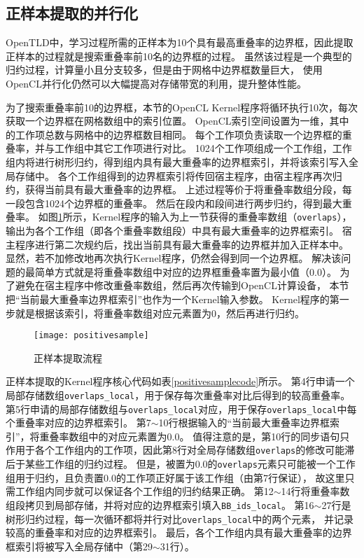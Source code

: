 \subsection{正样本提取的并行化}
OpenTLD中，学习过程所需的正样本为10个具有最高重叠率的边界框，因此提取正样本的过程就是搜索重叠率前10名的边界框的过程。
虽然该过程是一个典型的归约过程，计算量小且分支较多，但是由于网格中边界框数量巨大，
使用OpenCL并行化仍然可以大幅提高对存储带宽的利用，提升整体性能。

为了搜索重叠率前10的边界框，本节的OpenCL Kernel程序将循环执行10次，每次获取一个边界框在网格数组中的索引位置。
OpenCL索引空间设置为一维，其中的工作项总数与网格中的边界框数目相同。
每个工作项负责读取一个边界框的重叠率，并与工作组中其它工作项进行对比。
1024个工作项组成一个工作组，工作组内将进行树形归约，得到组内具有最大重叠率的边界框索引，并将该索引写入全局存储中。
各个工作组得到的边界框索引将传回宿主程序，由宿主程序再次归约，获得当前具有最大重叠率的边界框。
上述过程等价于将重叠率数组分段，每一段包含1024个边界框的重叠率。
然后在段内和段间进行两步归约，得到最大重叠率。
如图\ref{positivesample}所示，Kernel程序的输入为上一节获得的重叠率数组（\texttt{overlaps}），输出为各个工作组（即各个重叠率数组段）中具有最大重叠率的边界框索引。
宿主程序进行第二次规约后，找出当前具有最大重叠率的边界框并加入正样本中。
显然，若不加修改地再次执行Kernel程序，仍然会得到同一个边界框。
解决该问题的最简单方式就是将重叠率数组中对应的边界框重叠率置为最小值（$0.0$）。
为了避免在宿主程序中修改重叠率数组，然后再次传输到OpenCL计算设备，
本节把``当前最大重叠率边界框索引''也作为一个Kernel输入参数。
Kernel程序的第一步就是根据该索引，将重叠率数组对应元素置为0，然后再进行归约。

\begin{figure}[htb]
  \centering
  \texttt{[image: positivesample]}
  \caption{正样本提取流程}
  \label{positivesample}
\end{figure}

正样本提取的Kernel程序核心代码如表\ref{positivesamplecode}所示。
第4行申请一个局部存储数组\texttt{overlaps\_local}，用于保存每次重叠率对比后得到的较高重叠率。
第5行申请的局部存储数组与\texttt{overlaps\_local}对应，用于保存\texttt{overlaps\_local}中每个重叠率对应的边界框索引。
第7$\sim$10行根据输入的``当前最大重叠率边界框索引''，将重叠率数组中的对应元素置为$0.0$。
值得注意的是，第10行的同步语句只作用于各个工作组内的工作项，因此第8行对全局存储数组\texttt{overlaps}的修改可能滞后于某些工作组的归约过程。
但是，被置为$0.0$的\texttt{overlaps}元素只可能被一个工作组用于归约，且负责置$0.0$的工作项正好属于该工作组（由第7行保证），
故这里只需工作组内同步就可以保证各个工作组的归约结果正确。
第12$\sim$14行将重叠率数组段拷贝到局部存储，并将对应的边界框索引填入\texttt{BB\_ids\_local}。
第16$\sim$27行是树形归约过程，每一次循环都将并行对比\texttt{overlaps\_local}中的两个元素，
并记录较高的重叠率和对应的边界框索引。
最后，各个工作组内具有最大重叠率的边界框索引将被写入全局存储中（第29$\sim$31行）。

